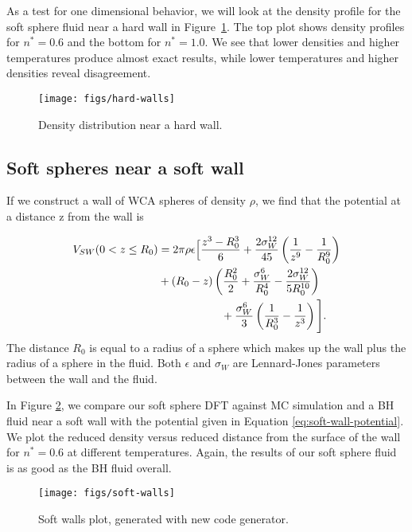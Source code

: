 \documentclass[letterpaper,twocolumn,amsmath,amssymb,prb]{revtex4-1}
\begin{document}
As a test for one dimensional behavior, we will look at the density
profile for the soft sphere fluid near a hard wall in
Figure~\ref{fig:hard-walls}. The top plot shows density profiles for
$n^*=0.6$ and the bottom for $n^*=1.0$. We see that lower densities
and higher temperatures produce almost exact results, while lower
temperatures and higher densities reveal disagreement.


\begin{figure}
\begin{center}
\texttt{[image: figs/hard-walls]}
\end{center}
\caption{Density distribution near a hard wall.}
\label{fig:hard-walls}
\end{figure}

\subsection{Soft spheres near a soft wall}

If we construct a wall of WCA spheres of density $\rho$, we
find that the potential at a distance z from the wall is

\begin{align}
V_{SW}(0 < z \leq R_0) &= 2\pi\rho\epsilon\Big[ \frac{z^3-R_0^3}{6} +
  \frac{2\sigma_W^{12}}{45} \left(\frac{1}{z^9}-\frac{1}{R_0^9}\right)
  \notag \\
  &+ \left( R_0 - z \right)\left(\frac{R_0^2}{2} +
  \frac{\sigma_W^6}{R_0^4} - \frac{2\sigma_W^{12}}{5R_0^{10}}\right)
  \notag \\
  &\hspace{2cm}+\frac{\sigma_W^6}{3}\left(\frac{1}{R_0^3}-\frac{1}{z^3}
  \right) \Bigg].
\label{eq:soft-wall-potential}
\end{align}
The distance $R_0$ is equal to a radius of a sphere which makes up the
wall plus the radius of a sphere in the fluid. Both $\epsilon$ and
$\sigma_W$ are Lennard-Jones parameters between the wall and the
fluid.

In Figure \ref{fig:soft-walls}, we compare our soft sphere DFT
against MC simulation and a BH fluid near a soft wall
with the potential given in Equation \ref{eq:soft-wall-potential}. We
plot the reduced density versus reduced distance from the surface of
the wall for $n^*=0.6$ at different temperatures. Again, the results
of our soft sphere fluid is as good as the BH fluid
overall.

\begin{figure}
  \texttt{[image: figs/soft-walls]}
  \caption{Soft walls plot, generated with new code generator.}
\label{fig:soft-walls}
\end{figure}
\end{document}
